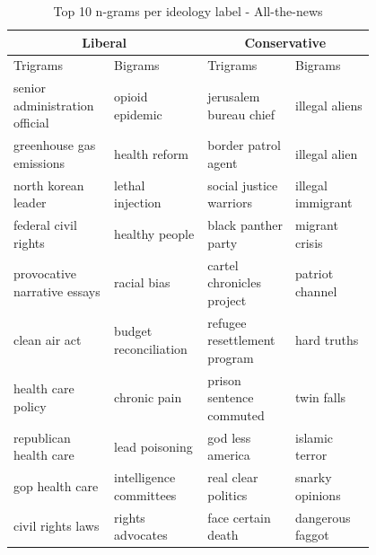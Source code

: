 \documentclass[10pt,a4paper,onecolumn]{article}
\begin{document}
\begin{table}[h!]
	\begin{center}
		\caption{Top 10 n-grams per ideology label - All-the-news}
		\label{tab:ngrams-atn}
		\begin{tabular}{p{0.2\linewidth}|p{0.2\linewidth}|p{0.2\linewidth}|p{0.2\linewidth}}
			\hline\hline
			\multicolumn{2}{c|}{\textbf{Liberal}} & \multicolumn{2}{c|}{\textbf{Conservative}} \\
			\hline
			Trigrams & Bigrams & Trigrams & Bigrams \\
			\hline
			senior administration official & opioid epidemic & jerusalem bureau chief & illegal aliens \\
			greenhouse gas emissions & health reform & border patrol agent & illegal alien \\
			north korean leader & lethal injection & social justice warriors & illegal immigrant \\
			federal civil rights & healthy people & black panther party & migrant crisis \\
			provocative narrative essays & racial bias & cartel chronicles project & patriot channel \\
			clean air act & budget reconciliation & refugee resettlement program & hard truths \\
			health care policy & chronic pain & prison sentence commuted & twin falls \\
			republican health care & lead poisoning & god less america & islamic terror \\
			gop health care & intelligence committees & real clear politics & snarky opinions \\
			civil rights laws & rights advocates & face certain death & dangerous faggot\footnotemark \\
			\hline\hline
		\end{tabular}
	\end{center}
\end{table}
\end{document}
